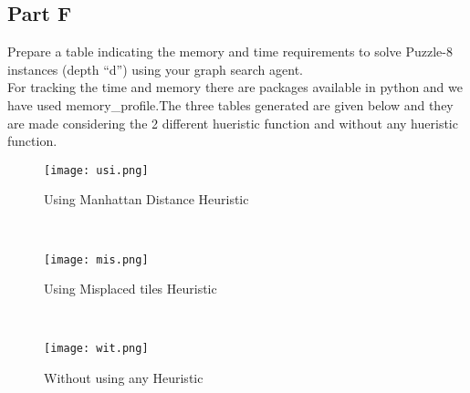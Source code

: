 \documentclass[conference]{IEEEtran}
\begin{document}
\subsection{Part F}
\newline
Prepare a table indicating the memory and time requirements to solve Puzzle-8 instances (depth “d”) using your graph search agent.
\\
For tracking the time and memory there are packages available in python and we have used memory\_profile.The three tables generated are given below and they are made considering the 2 different hueristic function and without any hueristic function.

\begin{figure}
\centerline{\texttt{[image: usi.png]}}
{        Using Manhattan Distance Heuristic}

\end{figure}
\\

\begin{figure}
\centerline{\texttt{[image: mis.png]}}
{        Using Misplaced tiles Heuristic}

\end{figure}
\\

\begin{figure}
\centerline{\texttt{[image: wit.png]}}
{        Without using any Heuristic}

\end{figure}
\end{document}
